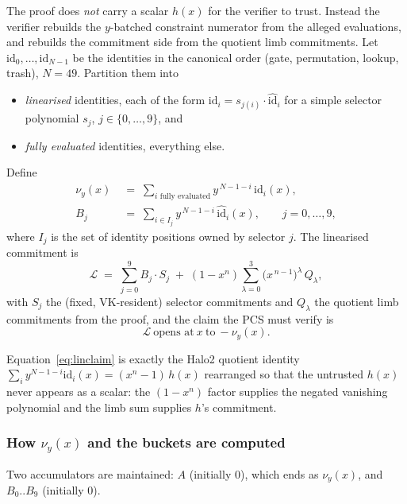 \documentclass[11pt,a4paper]{article}
\theoremstyle{definition}
\begin{document}
The proof does \emph{not} carry a scalar $h(x)$ for the verifier to trust.
Instead the verifier rebuilds the $y$-batched constraint numerator from the
alleged evaluations, and rebuilds the commitment side from the quotient limb
commitments. Let $\mathrm{id}_0,\dots,\mathrm{id}_{N-1}$ be the identities in
the canonical order (gate, permutation, lookup, trash), $N = 49$. Partition
them into
\begin{itemize}[leftmargin=1cm,nosep]
\item \emph{linearised} identities, each of the form
      $\mathrm{id}_i = s_{j(i)}\cdot \widehat{\mathrm{id}}_i$ for a simple
      selector polynomial $s_j$, $j \in \{0,\dots,9\}$, and
\item \emph{fully evaluated} identities, everything else.
\end{itemize}
Define
\begin{align}
\nu_y(x) &\;=\; \sum_{i \text{ fully evaluated}} y^{\,N-1-i}\,\mathrm{id}_i(x),
\label{eq:nu}\\
B_j &\;=\; \sum_{i \in I_j} y^{\,N-1-i}\,\widehat{\mathrm{id}}_i(x),
\qquad j = 0,\dots,9,
\label{eq:bucket}
\end{align}
where $I_j$ is the set of identity positions owned by selector $j$. The
linearised commitment is
\begin{equation}
\mathcal{L}
\;=\;
\sum_{j=0}^{9} B_j \cdot S_j
\;+\;
(1-x^{n})\sum_{\lambda=0}^{3} \big(x^{\,n-1}\big)^{\lambda}\, Q_\lambda,
\label{eq:lincom}
\end{equation}
with $S_j$ the (fixed, VK-resident) selector commitments and $Q_\lambda$ the
quotient limb commitments from the proof, and the claim the PCS must verify is
\begin{equation}
\boxed{\;\mathcal{L}\ \text{opens at}\ x\ \text{to}\ -\nu_y(x).\;}
\label{eq:linclaim}
\end{equation}

Equation~\eqref{eq:linclaim} is exactly the Halo2 quotient identity
$\sum_i y^{N-1-i}\mathrm{id}_i(x) = (x^{n}-1)\,h(x)$ rearranged so that the
untrusted $h(x)$ never appears as a scalar: the $(1-x^n)$ factor supplies the
negated vanishing polynomial and the limb sum supplies $h$'s commitment.

\subsubsection{How $\nu_y(x)$ and the buckets are computed}

Two accumulators are maintained: $A$ (initially $0$), which ends as
$\nu_y(x)$, and $B_0..B_9$ (initially $0$).
\end{document}
